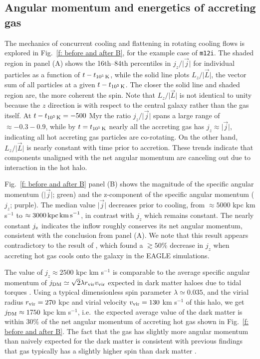 \documentclass[fleqn,usenatbib]{mnras}
\newcommand{\tcools}{t_{10^5\,{\rm K}}}
\newcommand{\Rvir}{r_{\rm vir}}
\newcommand{\vvir}{v_{\rm vir}}
\begin{document}
\subsection{Angular momentum and energetics of accreting gas}
\label{s: mechanics -- energy balance}

The mechanics of concurrent cooling and flattening in rotating cooling flows is explored in Fig.~\ref{f: before and after B}, for the example case of \texttt{m12i}.
The shaded region in panel (A) shows the 16th--84th percentiles in $j_z/\vert\vec j\vert$ for individual particles as a function of $t-\tcools$, while the solid line plots $L_z/\vert\vec L\vert$, the vector sum of all particles at a given $t-\tcools$.
The closer the solid line and shaded region are, the more coherent the spin.
Note that $L_z/\vert\vec L\vert$ is not identical to unity because the $z$ direction is with respect to the central galaxy rather than the gas itself.
At $t-\tcools=-500$ Myr the ratio $j_z/\vert\vec j\vert$ spans a large range of $\approx -0.3 - 0.9$, while by $t=\tcools$ nearly all the accreting gas has $j_z\approx\vert\vec j\vert$, indicating all hot accreting gas particles are co-rotating.
On the other hand,  $L_z/\vert\vec L\vert$ is nearly constant with time prior to accretion. 
These trends indicate that components unaligned with the net angular momentum are canceling out due to interaction in the hot halo.

Fig.~\ref{f: before and after B} panel (B) shows the magnitude of the specific angular momentum ($\vert \vec j \vert$; green) and the z-component of the specific angular momentum ($j_z$; purple).
The median value $\vert \vec j \vert$ decreases prior to cooling, from $\approx 5000$ kpc km s$^{-1}$ to $\approx 3000\,{\rm kpc\,km\,s}^{-1}$, in contrast with  $j_z$ which remains constant.
The nearly constant $j_{\rm z}$ indicates the inflow roughly conserves its net angular momentum, consistent with the conclusion from panel (A).
We note that this result appears contradictory to the result of \cite{Stevens2017}, which found a $\gtrsim50\%$ decrease in $j_z$ when accreting hot gas cools onto the galaxy in the EAGLE simulations.

The value of $j_z\approx 2500$ kpc km s$^{-1}$ is comparable to the average specific angular momentum of $j_{\rm DM} \simeq \sqrt{2}\lambda \Rvir \vvir$ expected in dark matter haloes due to tidal torques \citep[e.g.][]{Bullock2001}.
Using a typical dimensionless spin parameter $\lambda \simeq 0.035$, and the virial radius $\Rvir=270$ kpc and virial velocity $\vvir=130$ km s$^{-1}$ of this halo, we get $j_{\rm DM}\approx1750$ kpc km s$^{-1}$, i.e.~the expected average value of the dark matter is within $30\%$ of the net angular momentum of accreting hot gas shown in Fig.~\ref{f: before and after B}. 
The fact that the gas has slightly more angular momentum than naively expected for the dark matter is consistent with previous findings that gas typically has a slightly higher spin than dark matter \citep[e.g.][]{Stewart2017}.
\end{document}
